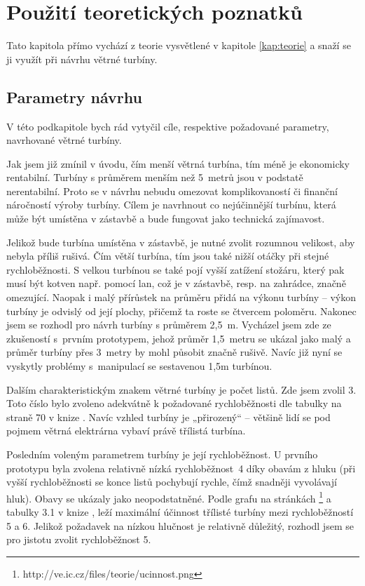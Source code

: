 \chapter{Použití teoretických poznatků}\label{chap:praxe}
Tato kapitola přímo vychází z teorie vysvětlené v kapitole \ref{kap:teorie} a snaží se ji využít při návrhu větrné turbíny.

\section{Parametry návrhu}
V této podkapitole bych rád vytyčil cíle, respektive požadované parametry, navrhované větrné turbíny.

Jak jsem již zmínil v úvodu, čím menší větrná turbína, tím méně je ekonomicky rentabilní. Turbíny s průměrem menším než 5~metrů jsou v podstatě nerentabilní. Proto se v návrhu nebudu omezovat komplikovaností či finanční náročností výroby turbíny. Cílem je navrhnout co nejúčinnější turbínu, která může být umístěna v zástavbě a bude fungovat jako technická zajímavost.

Jelikož bude turbína umístěna v zástavbě, je nutné zvolit rozumnou velikost, aby nebyla příliš rušivá. Čím větší turbína, tím jsou také nižší otáčky při stejné rychloběžnosti. S velkou turbínou se také pojí vyšší zatížení stožáru, který pak musí být kotven např. pomocí lan, což je v zástavbě, resp. na zahrádce, značně omezující. Naopak i malý přírůstek na průměru přidá na výkonu turbíny – výkon turbíny je odvislý od její plochy, přičemž ta roste se čtvercem poloměru. Nakonec jsem se rozhodl pro návrh turbíny s průměrem 2,5~m. Vycházel jsem zde ze zkušeností s~prvním prototypem, jehož průměr 1,5~metru se ukázal jako malý a průměr turbíny přes 3~metry by mohl působit značně rušivě. Navíc již nyní se vyskytly problémy s~manipulací se sestavenou 1,5m turbínou.

Dalším charakteristickým znakem větrné turbíny je počet listů. Zde jsem zvolil 3. Toto číslo bylo zvoleno adekvátně k požadované rychloběžnosti dle tabulky na straně 70 v knize \cite{Rychetnik:Motory}. Navíc vzhled turbíny je „přirozený“ – většině lidí se pod pojmem větrná elektrárna vybaví právě třílistá turbína.

Posledním voleným parametrem turbíny je její rychloběžnost. U prvního prototypu byla zvolena relativně nízká rychloběžnost~4 díky obavám z hluku (při vyšší rychloběžnosti se konce listů pochybují rychle, čímž snadněji vyvolávají hluk). Obavy se ukázaly jako neopodstatněné. Podle grafu na stránkách \cite{ve:ve}\footnote{http://ve.ic.cz/files/teorie/ucinnost.png}  a tabulky 3.1 v knize \cite{Rychetnik:Motory}, leží maximální účinnost třílisté turbíny mezi rychloběžností 5 a 6. Jelikož požadavek na nízkou hlučnost je relativně důležitý, rozhodl jsem se pro jistotu zvolit rychloběžnost 5.


